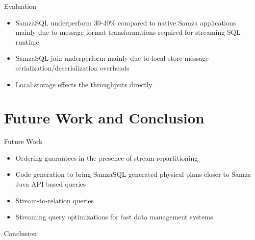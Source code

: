 \documentclass[newPxFont]{beamer}
\begin{document}
\begin{frame}[c]{Evaluation}
\begin{itemize}
	\item SamzaSQL underperform 30-40\% compared to native Samza applications mainly due to message format transformations required for streaming SQL runtime
	\item SamzaSQL join underperform mainly due to local store message serialization/deserialization overheads
	\item Local storage effects the throughputs directly

\end{itemize}
\end{frame}


\section{Future Work and Conclusion}


\begin{frame}{Future Work}
\begin{itemize}
	\item Ordering guarantees in the presence of stream repartitioning 
	\item Code generation to bring SamzaSQL generated physical plans closer to Samza Java API based queries  
	\item Stream-to-relation queries
	\item Streaming query optimizations for fast data management systems
\end{itemize}
\end{frame}


\begin{frame}{Conclusion}

\end{frame}
\end{document}
